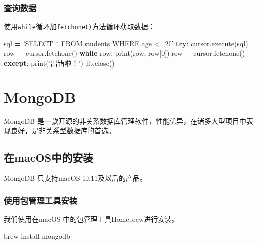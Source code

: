 \documentclass[]{ctexbook}
\newenvironment{Shaded}{\begin{snugshade}}{\end{snugshade}}
\newcommand{\BuiltInTok}[1]{#1}
\newcommand{\ControlFlowTok}[1]{\textcolor[rgb]{0.13,0.29,0.53}{\textbf{#1}}}
\newcommand{\DecValTok}[1]{\textcolor[rgb]{0.00,0.00,0.81}{#1}}
\newcommand{\ExtensionTok}[1]{#1}
\newcommand{\NormalTok}[1]{#1}
\newcommand{\OperatorTok}[1]{\textcolor[rgb]{0.81,0.36,0.00}{\textbf{#1}}}
\newcommand{\StringTok}[1]{\textcolor[rgb]{0.31,0.60,0.02}{#1}}
\begin{document}
\hypertarget{ux67e5ux8be2ux6570ux636e}{%
\subsubsection{查询数据}\label{ux67e5ux8be2ux6570ux636e}}

使用\texttt{while}循环加\texttt{fetchone()}方法循环获取数据：

\begin{Shaded}
\begin{Highlighting}[]
\NormalTok{sql }\OperatorTok{=} \StringTok{'SELECT * FROM students WHERE age <=20'}
\ControlFlowTok{try}\NormalTok{:}
\NormalTok{    cursor.execute(sql)}
\NormalTok{    row }\OperatorTok{=}\NormalTok{ cursor.fetchone()}
    \ControlFlowTok{while}\NormalTok{ row:}
        \BuiltInTok{print}\NormalTok{(row, row[}\DecValTok{0}\NormalTok{])}
\NormalTok{        row }\OperatorTok{=}\NormalTok{ cursor.fetchone()}
\ControlFlowTok{except}\NormalTok{:}
    \BuiltInTok{print}\NormalTok{(}\StringTok{'出错啦！'}\NormalTok{)}
\NormalTok{db.close()}
\end{Highlighting}
\end{Shaded}

\hypertarget{mongodb}{%
\section{MongoDB}\label{mongodb}}

MongoDB 是一款开源的非关系数据库管理软件，性能优异，在诸多大型项目中表现良好，是非关系型数据库的首选。

\hypertarget{ux5728macosux4e2dux7684ux5b89ux88c5}{%
\subsection{在macOS中的安装}\label{ux5728macosux4e2dux7684ux5b89ux88c5}}

MongoDB 只支持macOS 10.11及以后的产品。

\hypertarget{ux4f7fux7528ux5305ux7ba1ux7406ux5de5ux5177ux5b89ux88c5}{%
\subsubsection{使用包管理工具安装}\label{ux4f7fux7528ux5305ux7ba1ux7406ux5de5ux5177ux5b89ux88c5}}

我们使用在macOS 中的包管理工具Homebrew进行安装。

\begin{Shaded}
\begin{Highlighting}[]
\ExtensionTok{brew}\NormalTok{ install mongodb}
\end{Highlighting}
\end{Shaded}
\end{document}

